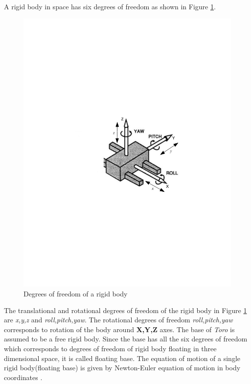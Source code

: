A rigid body in space has six degrees of freedom as shown in Figure \ref{fig:rbody}.
\begin{figure}
\begin{center}
\includegraphics[trim= 30mm 100mm 10mm 120mm,scale=0.75]{Bilder/rbody_dof.pdf}
\caption[Degrees of freedom of a rigid body]{Degrees of freedom of a rigid body \footnotemark[1]}
\label{fig:rbody}
\end{center}
\end{figure}
The translational and rotational degrees of freedom of the rigid body in Figure \ref{fig:rbody} are \emph{x,y,z} and \emph{roll,pitch,yaw}. The rotational degrees of freedom \emph{roll,pitch,yaw} corresponds to rotation of the body around \textbf{X,Y,Z} axes. The base of \emph{Toro} is assumed to be a free rigid body. Since the base has all the six degrees of freedom which corresponds to degrees of freedom of rigid body floating in three dimensional space, it is called floating base. The equation of motion of a single rigid body(floating base) is given by Newton-Euler equation of motion in body coordinates \cite[Chapter 4]{mur94}. 
